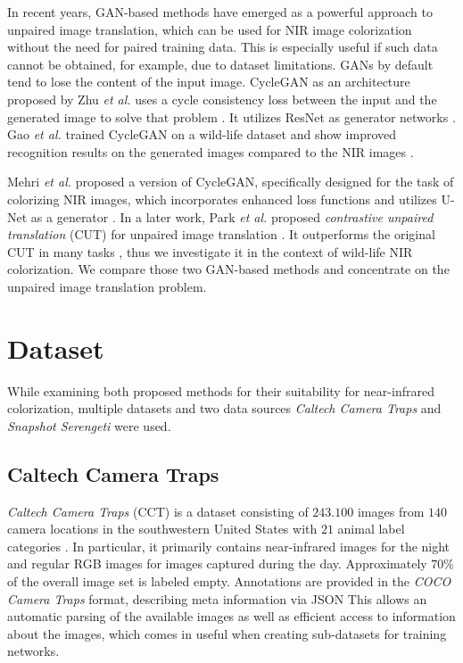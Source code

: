 \documentclass[a4paper,11pt, DIV=12]{scrartcl}
\begin{document}
In recent years, GAN-based methods have emerged as a powerful approach to unpaired image translation, which can be used for NIR image colorization without the need for paired training data.
This is especially useful if such data cannot be obtained, for example, due to dataset limitations.
GANs by default tend to lose the content of the input image. CycleGAN as an architecture proposed by Zhu \textit{et al.} uses a cycle consistency loss between the input and the generated image to solve that problem \cite{cyclegan_orig}.
It utilizes ResNet \cite{resnet} as generator networks \cite{cyclegan_orig}.
Gao \textit{et al.} trained CycleGAN on a wild-life dataset and show improved recognition results on the generated images compared to the NIR images \cite{cyclegan_camera_traps}.

Mehri \textit{et al.} proposed a version of CycleGAN, specifically designed for the task of colorizing NIR images, which incorporates enhanced loss functions and utilizes U-Net as a generator \cite{mehri2019colorizing}.
In a later work, Park \textit{et al.} proposed \textit{contrastive unpaired translation} (CUT) for unpaired image translation \cite{cut}.
It outperforms the original CUT in many tasks \cite{cut}, thus we investigate it in the context of wild-life NIR colorization.
We compare those two GAN-based methods and concentrate on the unpaired image translation problem.

\section{Dataset}
While examining both proposed methods for their suitability for near-infrared colorization, multiple datasets
and two data sources \textit{Caltech Camera Traps} \cite{caltech} and \textit{Snapshot Serengeti} \cite{serengeti} were used.

\subsection{Caltech Camera Traps}
\textit{Caltech Camera Traps} (CCT) is a dataset consisting of $243.100$ images from $140$ camera locations
in the southwestern United States with $21$ animal label categories \cite{caltech}.
In particular, it primarily contains near-infrared images for the night and regular RGB images for images captured during the day.
Approximately $70 \%$ of the overall image set is labeled empty.
Annotations are provided in the \textit{COCO Camera Traps} format, describing meta information via JSON \cite{caltech}
This allows an automatic parsing of the available images as well as efficient access to information about
the images, which comes in useful when creating sub-datasets for training networks.
\end{document}
